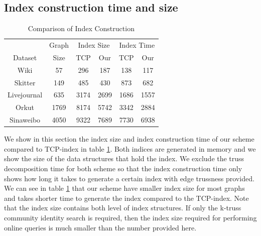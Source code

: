 \subsection{Index construction time and size}
\label{eval_const}

\begin{table}
		\caption{Comparison of Index Construction}
		\vspace{2 mm}
		\label{table:index_construction}
		\centering
		\begin{tabular}{|c|c|cc|cc|} \hline 
			 & Graph & \multicolumn{2}{|c|}{Index Size} & \multicolumn{2}{|c}{Index Time} \\
			\cline{3-6}
			Dataset & Size & TCP  & Our & TCP & Our \\ \hline
			Wiki & 57 & 296 & 187 & 138 & 117\\ 
			Skitter & 149 & 485 & 430 & 873 & 682\\ 
			Livejournal & 635 & 3174 & 2699 & 1686 & 1557\\ 
			Orkut & 1769 & 8174 & 5742 & 3342 & 2884\\ 
			Sinaweibo & 4050 & 9322 & 7689 & 7730 & 6938 \\ \hline
		\end{tabular}
\end{table}

We show in this section the index size and index construction time of our scheme compared to TCP-index in 
table \ref{table:index_construction}. Both indices are generated in memory and we show the size of the data structures that hold the index. We exclude the truss decomposition time for both scheme so that the index construction time only shows how long it takes to generate a certain index with edge trussness provided.  We can see in table \ref{table:index_construction} that our scheme have smaller index size for most graphs and takes shorter time to generate the index compared to the TCP-index. Note that the index size contains both level of index structures. If only the k-truss community identity search is required, then the index size required for performing online queries is much smaller than the number provided here.

%


